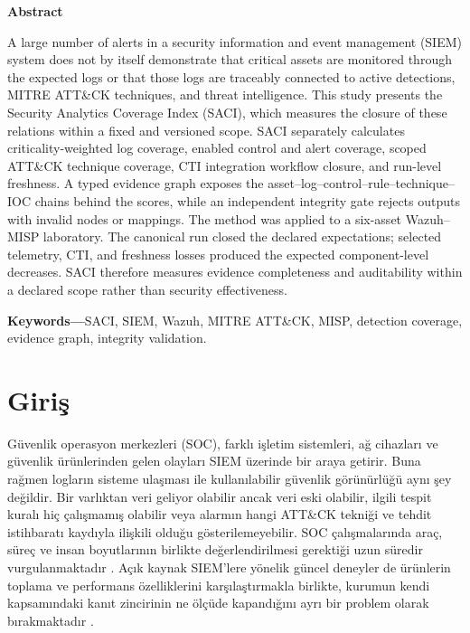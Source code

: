 \documentclass[conference]{IEEEtran}
\begin{document}
\begin{center}\textbf{Abstract}\end{center}
{\small A large number of alerts in a security information and event management (SIEM) system does not by itself demonstrate that critical assets are monitored through the expected logs or that those logs are traceably connected to active detections, MITRE ATT\&CK techniques, and threat intelligence. This study presents the Security Analytics Coverage Index (SACI), which measures the closure of these relations within a fixed and versioned scope. SACI separately calculates criticality-weighted log coverage, enabled control and alert coverage, scoped ATT\&CK technique coverage, CTI integration workflow closure, and run-level freshness. A typed evidence graph exposes the asset--log--control--rule--technique--IOC chains behind the scores, while an independent integrity gate rejects outputs with invalid nodes or mappings. The method was applied to a six-asset Wazuh--MISP laboratory. The canonical run closed the declared expectations; selected telemetry, CTI, and freshness losses produced the expected component-level decreases. SACI therefore measures evidence completeness and auditability within a declared scope rather than security effectiveness.\par}
\vspace{2pt}
{\small\textbf{Keywords---}SACI, SIEM, Wazuh, MITRE ATT\&CK, MISP, detection coverage, evidence graph, integrity validation.}

\section{Giriş}
Güvenlik operasyon merkezleri (SOC), farklı işletim sistemleri, ağ cihazları ve güvenlik ürünlerinden gelen olayları SIEM üzerinde bir araya getirir. Buna rağmen logların sisteme ulaşması ile kullanılabilir güvenlik görünürlüğü aynı şey değildir. Bir varlıktan veri geliyor olabilir ancak veri eski olabilir, ilgili tespit kuralı hiç çalışmamış olabilir veya alarmın hangi ATT\&CK tekniği ve tehdit istihbaratı kaydıyla ilişkili olduğu gösterilemeyebilir. SOC çalışmalarında araç, süreç ve insan boyutlarının birlikte değerlendirilmesi gerektiği uzun süredir vurgulanmaktadır \cite{vielberth2020,agyepong2020,sundaramurthy2014}. Açık kaynak SIEM'lere yönelik güncel deneyler de ürünlerin toplama ve performans özelliklerini karşılaştırmakla birlikte, kurumun kendi kapsamındaki kanıt zincirinin ne ölçüde kapandığını ayrı bir problem olarak bırakmaktadır \cite{manzoor2024}.
\end{document}
